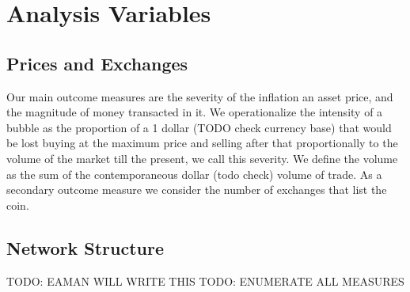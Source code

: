 \section{Analysis Variables}
\subsection{Prices and Exchanges}
Our main outcome measures are the severity of the inflation an asset price, and the magnitude of money transacted in it.
We operationalize the intensity of a bubble as the proportion of a 1 dollar (TODO check currency base) that would be lost buying at the maximum price and selling after that proportionally to the volume of the market till the present, we call this severity.
We define the volume as the sum of the contemporaneous dollar (todo check) volume of trade.
As a secondary outcome measure we consider the number of exchanges that list the coin.


\subsection{Network Structure}
TODO: EAMAN WILL WRITE THIS
TODO: ENUMERATE ALL MEASURES
